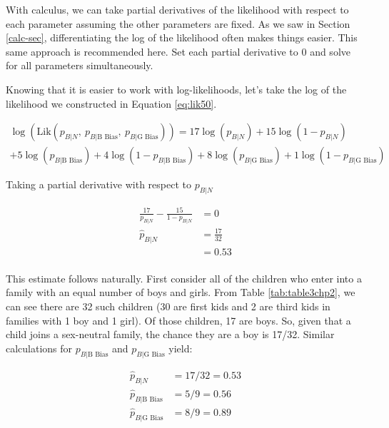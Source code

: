 \documentclass[
]{krantz}
\newcommand{\lik}{\mathrm{Lik}}
\newcommand{\neutral}{p_{B|N}}
\newcommand{\gbias}{p_{B|\textrm{G Bias}}}
\newcommand{\bbias}{p_{B|\textrm{B Bias}}}
\begin{document}
With calculus, we can take partial derivatives of the likelihood with respect to each parameter assuming the other parameters are fixed. As we saw in Section \ref{calc-sec}, differentiating the log of the likelihood often makes things easier. This same approach is recommended here. Set each partial derivative to 0 and solve for all parameters simultaneously.

Knowing that it is easier to work with log-likelihoods, let's take the log of the likelihood we constructed in Equation \eqref{eq:lik50}.

\begin{multline*}
\log (\lik(\neutral,\ \bbias,\ \gbias)) = 
        17\log(\neutral)+15\log(1-\neutral) \\
        +5\log(\bbias)+4\log(1-\bbias) 
        +8\log(\gbias)+1\log(1-\gbias)
\end{multline*}

Taking a partial derivative with respect to \(\neutral\)

\begin{align*}
\frac{17}{\neutral}  - \frac{15}{1-\neutral}&=0 \\
\hat{p}_{B|N}&= \frac{17}{32} \\
&=0.53 \\
\end{align*}

This estimate follows naturally. First consider all of the children who enter into a family with an equal number of boys and girls. From Table \ref{tab:table3chp2}, we can see there are 32 such children (30 are first kids and 2 are third kids in families with 1 boy and 1 girl). Of those children, 17 are boys. So, given that a child joins a sex-neutral family, the chance they are a boy is 17/32. Similar calculations for \(\bbias\) and \(\gbias\) yield:

\begin{align*}
 \hat{p}_{B|N} &= 17/32 = 0.53  \\  
 \hat{p}_{B|\textrm{B Bias}} &= 5/9 = 0.56  \\
 \hat{p}_{B|\textrm{G Bias}} &= 8/9 = 0.89  
\end{align*}
\end{document}
